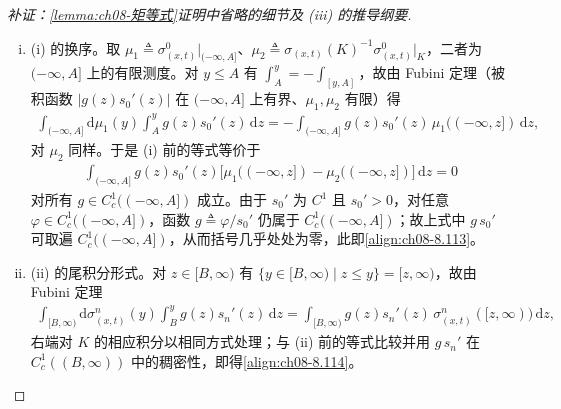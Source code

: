 \documentclass[../../main.tex]{subfiles}%
\begin{document}
\begin{proof}[补证：\cref{lemma:ch08-矩等式}证明中省略的细节及 (iii) 的推导纲要]
\begin{enumerate}[(i)]
\item (i) 的换序。取 $\mu_1\triangleq\sigma^0_{(x,t)}|_{(-\infty,A]}$、$\mu_2\triangleq\sigma_{(x,t)}(K)^{-1}\sigma^0_{(x,t)}|_{K}$，二者为 $(-\infty,A]$ 上的有限测度。对 $y\leqslant A$ 有 $\int_A^y=-\int_{[y,A]}$，故由 Fubini 定理（被积函数 $|g(z)s_0'(z)|$ 在 $(-\infty,A]$ 上有界、$\mu_1,\mu_2$ 有限）得
\begin{align*}
\int_{(-\infty,A]}\mathrm{d}\mu_1(y)\int_A^y g(z)s_0'(z)\,\mathrm{d}z
=-\int_{(-\infty,A]}g(z)s_0'(z)\,\mu_1((-\infty,z])\,\mathrm{d}z,
\end{align*}
对 $\mu_2$ 同样。于是 (i) 前的等式等价于
\begin{align*}
\int_{(-\infty,A]}g(z)s_0'(z)\big[\mu_1((-\infty,z])-\mu_2((-\infty,z])\big]\,\mathrm{d}z=0
\end{align*}
对所有 $g\in C_c^1((-\infty,A])$ 成立。由于 $s_0'$ 为 $C^1$ 且 $s_0'>0$，对任意 $\varphi\in C_c^1((-\infty,A])$，函数 $g\triangleq\varphi/s_0'$ 仍属于 $C_c^1((-\infty,A])$；故上式中 $g\,s_0'$ 可取遍 $C_c^1((-\infty,A])$，从而括号几乎处处为零，此即\eqref{align:ch08-8.113}。
\item (ii) 的尾积分形式。对 $z\in[B,\infty)$ 有 $\{y\in[B,\infty)\mid z\leqslant y\}=[z,\infty)$，故由 Fubini 定理
\begin{align*}
\int_{[B,\infty)}\mathrm{d}\sigma^n_{(x,t)}(y)\int_B^y g(z)s_n'(z)\,\mathrm{d}z
=\int_{[B,\infty)}g(z)s_n'(z)\,\sigma^n_{(x,t)}([z,\infty))\,\mathrm{d}z,
\end{align*}
右端对 $K$ 的相应积分以相同方式处理；与 (ii) 前的等式比较并用 $g\,s_n'$ 在 $C_c^1((B,\infty))$ 中的稠密性，即得\eqref{align:ch08-8.114}。

\end{enumerate}
\end{proof}
\end{document}
